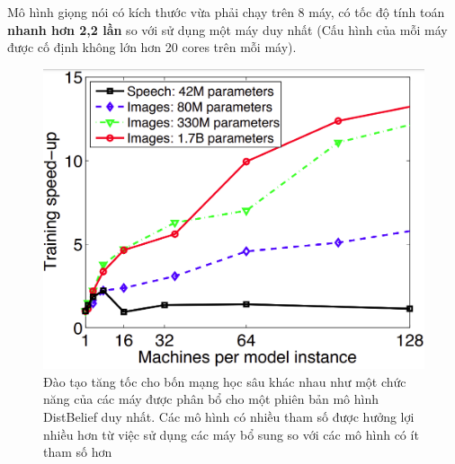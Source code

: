 \documentclass[11pt,a4paper]{article}
\numberwithin{equation}{subsection}
\numberwithin{figure}{subsection}
\numberwithin{table}{subsection}
\begin{document}
Mô hình giọng nói có kích thước vừa phải chạy trên 8 máy, có tốc độ tính toán \textbf{ nhanh hơn 2,2 lần} so với sử dụng một máy duy nhất (Cấu hình của mỗi máy được cố định không lớn hơn 20 cores trên mỗi máy).

\begin{figure}[!h]
	\begin{center}
		\includegraphics[scale=0.65]{GG_1.PNG}
	\end{center}
	\caption{Đào tạo tăng tốc cho bốn mạng học sâu khác nhau như một chức năng của các máy được phân bổ cho một phiên bản mô hình DistBelief duy nhất. Các mô hình có nhiều tham số được hưởng lợi nhiều hơn từ việc sử dụng các máy bổ sung so với các mô hình có ít tham số hơn}
\end{figure}
\end{document}
